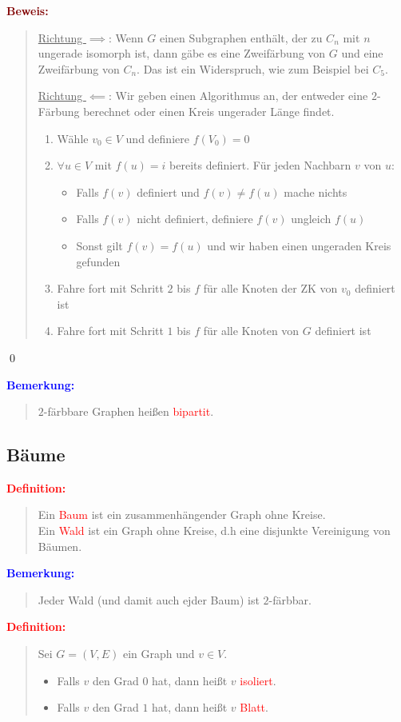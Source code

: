 \documentclass{article}
\newcommand{\red}[1]{\textcolor{red}{#1}}
\newcommand{\blue}[1]{\textcolor{blue}{#1}}
\newcommand{\maroon}[1]{\textcolor{maroon}{#1}}
\newcommand{\de}[1]{\red{\textbf{Definition: }}\begin{quote}#1\end{quote}}
\newcommand{\an}[1]{\blue{\textbf{Bemerkung: }}\begin{quote}#1\end{quote}}
\newcommand{\pr}[1]{\maroon{\textbf{Beweis: }}\begin{quote}#1\end{quote}\qed}
\begin{document}
\pr{
    \underline{Richtung $\implies$}: Wenn $G$ einen Subgraphen enthält, der zu $C_n$ mit $n$ ungerade isomorph ist, dann gäbe es eine Zweifärbung von $G$ und eine Zweifärbung von $C_n$. Das ist ein Widerspruch, wie zum Beispiel bei $C_5$.

    \underline{Richtung $\impliedby$}: Wir geben einen Algorithmus an, der entweder eine $2$-Färbung berechnet oder einen Kreis ungerader Länge findet.
    \begin{enumerate}
        \item Wähle $v_0 \in V$ und definiere $f(V_0) = 0$
        \item $\forall u \in V$ mit $f(u) = i$ bereits definiert. Für jeden Nachbarn $v$ von $u$:
        \begin{itemize}
            \item Falls $f(v)$ definiert und $f(v) \ne f(u)$ mache nichts
            \item Falls $f(v)$ nicht definiert, definiere $f(v)$ ungleich $f(u)$
            \item Sonst gilt $f(v) = f(u)$ und wir haben einen ungeraden Kreis gefunden
        \end{itemize}
        \item Fahre fort mit Schritt $2$ bis $f$ für alle Knoten der ZK von $v_0$ definiert ist
        \item Fahre fort mit Schritt $1$ bis $f$ für alle Knoten von $G$ definiert ist
    \end{enumerate}
}

\an{
    $2$-färbbare Graphen heißen \red{bipartit}.
}

\subsection{Bäume}

\de{
    Ein \red{Baum} ist ein zusammenhängender Graph ohne Kreise.\\
    Ein \red{Wald} ist ein Graph ohne Kreise, d.h eine disjunkte Vereinigung von Bäumen.
}

\an{
    Jeder Wald (und damit auch ejder Baum) ist $2$-färbbar.
}

\de{
    Sei $G = (V,E)$ ein Graph und $v \in V$.
    \begin{itemize}
        \item Falls $v$ den Grad $0$ hat, dann heißt $v$ \red{isoliert}.
        \item Falls $v$ den Grad $1$ hat, dann heißt $v$ \red{Blatt}.
    \end{itemize}
}
\end{document}
